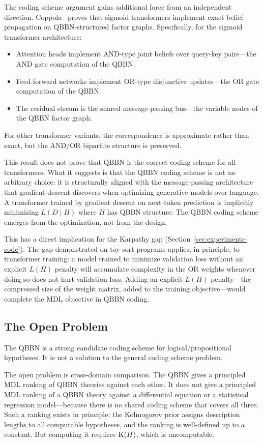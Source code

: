 The coding scheme argument gains additional force from an independent
direction. Coppola~\cite{coppola2026} proves that sigmoid transformers
implement exact belief propagation on QBBN-structured factor graphs.
Specifically, for the sigmoid transformer architecture:
\begin{itemize}
  \item Attention heads implement AND-type joint beliefs over
        query-key pairs---the AND gate computation of the QBBN.
  \item Feed-forward networks implement OR-type disjunctive
        updates---the OR gate computation of the QBBN.
  \item The residual stream is the shared message-passing bus---the
        variable nodes of the QBBN factor graph.
\end{itemize}
For other transformer variants, the correspondence is approximate
rather than exact, but the AND/OR bipartite structure is preserved.

This result does not prove that QBBN is the correct coding scheme for
all transformers. What it suggests is that the QBBN coding scheme is
not an arbitrary choice: it is structurally aligned with the
message-passing architecture that gradient descent discovers when
optimizing generative models over language. A transformer trained by
gradient descent on next-token prediction is implicitly minimizing
$L(D \mid H)$ where $H$ has QBBN structure. The QBBN coding scheme
emerges from the optimization, not from the design.

This has a direct implication for the Karpathy gap
(Section~\ref{sec:experiments-code}). The gap demonstrated on toy
sort programs applies, in principle, to transformer training: a model
trained to minimize validation loss without an explicit $L(H)$ penalty
will accumulate complexity in the OR weights whenever doing so does
not hurt validation loss. Adding an explicit $L(H)$ penalty---the
compressed size of the weight matrix, added to the training
objective---would complete the MDL objective in QBBN coding.

\subsection{The Open Problem}

The QBBN is a strong candidate coding scheme for
logical/propositional hypotheses. It is not a solution to the general
coding scheme problem.

The open problem is cross-domain comparison. The QBBN gives a
principled MDL ranking of QBBN theories against each other. It does
not give a principled MDL ranking of a QBBN theory against a
differential equation or a statistical regression model---because
there is no shared coding scheme that covers all three. Such a ranking
exists in principle: the Kolmogorov prior assigns description lengths
to all computable hypotheses, and the ranking is well-defined up to a
constant. But computing it requires $\mathrm{K}(H)$, which is uncomputable.

